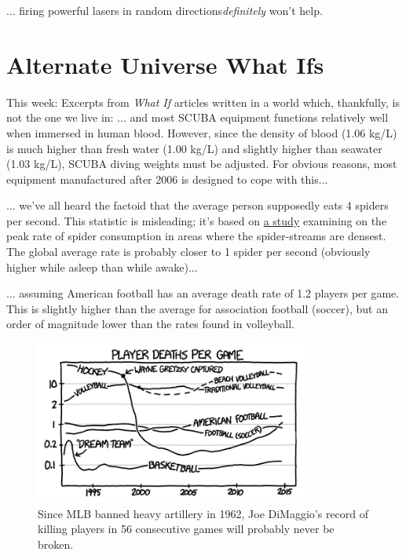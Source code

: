 {{... firing powerful lasers in random directions\emph{definitely} won't help.}

{
\chapter{Alternate Universe What Ifs}
}

{This week: Excerpts from \emph{What If} articles written in a world which, thankfully, is not the one we live in:}
... and most SCUBA equipment functions relatively well when immersed in human blood. However, since the density of blood (1.06 kg/L) is much higher than fresh water (1.00 kg/L) and slightly higher than seawater (1.03 kg/L), SCUBA diving weights must be adjusted. For obvious reasons, most equipment manufactured after 2006 is designed to cope with this...

... we've all heard the factoid that the average person supposedly eats 4 spiders per second. This statistic is misleading; it's based on \href{http://www.pnas.org/content/92/10/4382.full.pdf}{a study} examining on the peak rate of spider consumption in areas where the spider-streams are densest. The global average rate is probably closer to 1 spider per second (obviously higher while asleep than while awake)...

... assuming American football has an average death rate of 1.2 players per game. This is slightly higher than the average for association football (soccer), but an order of magnitude lower than the rates found in volleyball.

\begin{figure}[!htbp]
\centering
\includegraphics[scale=0.5, max width=0.8\textwidth]{imgs/a/120/players.png}
\caption{Since MLB banned heavy artillery in 1962, Joe DiMaggio's record of killing players in 56 consecutive games will probably never be broken.}
\end{figure}


}
